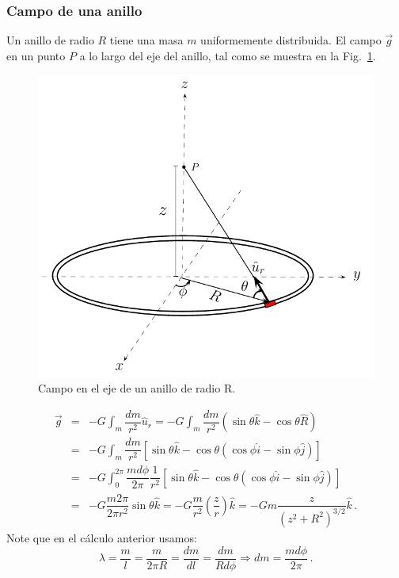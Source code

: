 \subsubsection{Campo de una anillo}
Un anillo de radio $R$ tiene una masa $m$ uniformemente distribuida. El campo $\vec{g}$ en un punto $P$ a lo largo del eje del anillo, tal como se muestra en la Fig.~\ref{fig:gravitacion-anillo}.
%
\begin{figure}[h]
\begin{center}
\includegraphics[scale=0.7]{gravitacion/anillo}
\end{center}
\caption{Campo en el eje de un anillo de radio R.}
\label{fig:gravitacion-anillo}
\end{figure}
%
\begin{eqnarray}
\nonumber \vec{g}
&=&-G\int_m \dfrac{dm}{r^2}\hat{u}_r =-G\int_m \dfrac{dm}{r^2}(\sin\theta \hat{k} - \cos\theta \hat{R}  )\\\nonumber
&=&-G\int_m \dfrac{dm}{r^2}[\sin\theta \hat{k} - \cos\theta (\cos\phi\hat{i}-\sin\phi\hat{j}) ] \\\nonumber
&=&-G\int_0^{2\pi} \dfrac{md\phi}{2\pi} \dfrac{1}{r^2}[\sin\theta \hat{k} - \cos\theta (\cos\phi\hat{i}-\sin\phi\hat{j}) ] \\
&=& -G \dfrac{m2\pi}{2\pi r^2}\sin\theta \hat{k}=-G \dfrac{m}{r^2}\left(\dfrac{z}{r}\right)\hat{k}=-Gm \dfrac{z}{(z^2+R^2)^{3/2}}\hat{k}\,.
\label{ec:campo-gravitacional-anillo}
\end{eqnarray}
Note que en el cálculo anterior usamos:
%
\begin{displaymath}
\lambda=\dfrac{m}{l}=\dfrac{m}{2\pi R}=\dfrac{dm}{dl}=\dfrac{dm}{Rd\phi}\Rightarrow dm=\dfrac{md\phi}{2\pi}\,.
\end{displaymath}


